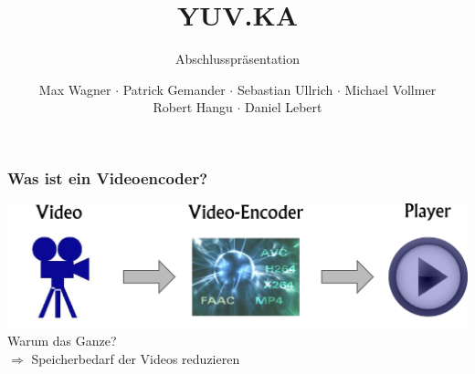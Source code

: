 \documentclass[t]{beamer}
\title{YUV.KA}
\subtitle{Abschlusspräsentation}
\author{Max Wagner $\cdot$ Patrick Gemander $\cdot$ Sebastian Ullrich $\cdot$ Michael Vollmer \\ Robert Hangu $\cdot$ Daniel Lebert}
\institute[ITEC]{Institut für Technische Informatik}
\begin{document}
\begin{frame}
	\maketitle
\end{frame}

\begin{frame}
	\frametitle{Was ist ein Videoencoder?}
	
	\begin{center}
		\vspace*{\fill}
		\includegraphics[scale=.43]{video-encoding-process.png}
		\vspace*{\fill}
		\onslide<2-> Warum das Ganze? ~\\
		\onslide<3-> $ \Longrightarrow $ Speicherbedarf der Videos reduzieren
	\end{center}
\end{frame}
\end{document}
